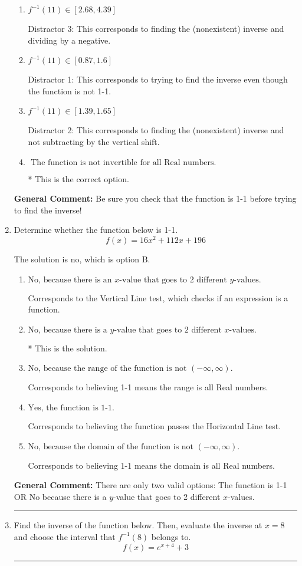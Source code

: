 \documentclass{extbook}[14pt]
\newcommand{\litem}[1]{\item #1

\rule{\textwidth}{0.4pt}}
\begin{document}
\begin{enumerate}
{\begin{enumerate}[label=\Alph*.]
 Distractor 4: This corresponds to both distractors 2 and 3.
\item \( f^{-1}(11) \in [2.68, 4.39] \)

 Distractor 3: This corresponds to finding the (nonexistent) inverse and dividing by a negative.
\item \( f^{-1}(11) \in [0.87, 1.6] \)

 Distractor 1: This corresponds to trying to find the inverse even though the function is not 1-1. 
\item \( f^{-1}(11) \in [1.39, 1.65] \)

 Distractor 2: This corresponds to finding the (nonexistent) inverse and not subtracting by the vertical shift.
\item \( \text{ The function is not invertible for all Real numbers. } \)

* This is the correct option.
\end{enumerate}

\textbf{General Comment:} Be sure you check that the function is 1-1 before trying to find the inverse!
}
\litem{
Determine whether the function below is 1-1.
\[ f(x) = 16 x^2 + 112 x + 196 \]

The solution is \( \text{no} \), which is option B.\begin{enumerate}[label=\Alph*.]
\item \( \text{No, because there is an $x$-value that goes to 2 different $y$-values.} \)

Corresponds to the Vertical Line test, which checks if an expression is a function.
\item \( \text{No, because there is a $y$-value that goes to 2 different $x$-values.} \)

* This is the solution.
\item \( \text{No, because the range of the function is not $(-\infty, \infty)$.} \)

Corresponds to believing 1-1 means the range is all Real numbers.
\item \( \text{Yes, the function is 1-1.} \)

Corresponds to believing the function passes the Horizontal Line test.
\item \( \text{No, because the domain of the function is not $(-\infty, \infty)$.} \)

Corresponds to believing 1-1 means the domain is all Real numbers.
\end{enumerate}

\textbf{General Comment:} There are only two valid options: The function is 1-1 OR No because there is a $y$-value that goes to 2 different $x$-values.
}
\litem{
Find the inverse of the function below. Then, evaluate the inverse at $x = 8$ and choose the interval that $f^{-1}(8)$ belongs to.
\[ f(x) = e^{x+4}+3 \]

}
\end{enumerate}
\end{document}
